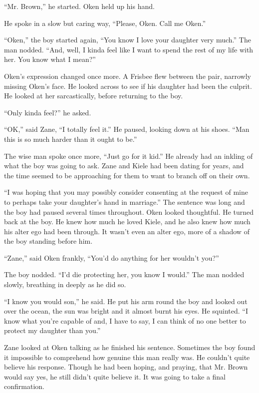 ``Mr. Brown,'' he started.  Oken held up his hand.

He spoke in a slow but caring way, ``Please, Oken.  Call me Oken.''

``Oken,'' the boy started again, ``You know I love your daughter very much.''  The man nodded.  ``And, well, I kinda feel like I want to spend the rest of my life with her.  You know what I mean?''

Oken's expression changed once more.  A Frisbee flew between the pair, narrowly missing Oken's face.  He looked across to see if his daughter had been the culprit.  He looked at her sarcastically, before returning to the boy.  

``Only kinda feel?'' he asked.

``OK,'' said Zane, ``I totally feel it.''  He paused, looking down at his shoes.  ``Man this is so much harder than it ought to be.''

The wise man spoke once more, ``Just go for it kid.''  He already had an inkling of what the boy was going to ask.  Zane and Kiele had been dating for years, and the time seemed to be approaching for them to want to branch off on their own.

``I was hoping that you may possibly consider consenting at the request of mine to perhaps take your daughter's hand in marriage.''  The sentence was long and the boy had paused several times throughout.  Oken looked thoughtful.  He turned back at the boy.  He knew how much he loved Kiele, and he also knew how much his alter ego had been through.  It wasn't even an alter ego, more of a shadow of the boy standing before him.  

``Zane,'' said Oken frankly, ``You'd do anything for her wouldn't you?''

  The boy nodded.  ``I'd die protecting her, you know I would.''  The man nodded slowly, breathing in deeply as he did so.  

``I know you would son,'' he said.  He put his arm round the boy and looked out over the ocean, the sun was bright and it almost burnt his eyes.  He squinted.  ``I know what you're capable of and, I have to say, I can think of no one better to protect my daughter than you.''

Zane looked at Oken talking as he finished his sentence.  Sometimes the boy found it impossible to comprehend how genuine this man really was.  He couldn't quite believe his response.  Though he had been hoping, and praying, that Mr. Brown would say yes, he still didn't quite believe it.  It was going to take a final confirmation.

